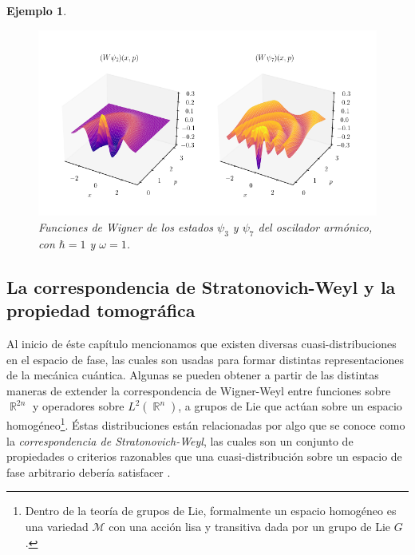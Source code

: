 \documentclass[a4paper]{report}
\DeclareMathOperator{\R}{\mathbb{R}}
\newtheorem{example}{Ejemplo}
\begin{document}
\begin{example}
    \begin{figure}[ht]
      \centering
      \includegraphics[width=1\textwidth]{
        imgs/harmonic_osc_wigner.png
      }
      \caption{Funciones de Wigner de los estados $\psi_3$ y
      $\psi_7$ del oscilador armónico, con $\hbar = 1$ y
      $\omega = 1$.}
      \label{fig:harmonic_osc_wigner_3_7}
    \end{figure}
  \end{example}
  
  \subsection{La correspondencia de Stratonovich-Weyl y la
  propiedad tomográfica}

  Al inicio de éste capítulo mencionamos que existen
  diversas cuasi-distribuciones en el espacio de fase, las
  cuales son usadas para formar distintas representaciones
  de la mecánica cuántica. Algunas se pueden obtener a
  partir de las distintas maneras de extender la
  correspondencia de Wigner-Weyl entre funciones sobre
  $\R^{2n}$ y operadores sobre $L^2(\R^{n})$, a grupos de
  Lie que actúan sobre un espacio homogéneo\footnote{Dentro
    de la teoría de grupos de Lie, formalmente un espacio
  homogéneo es una variedad $\mathcal M$ con una acción lisa
  y transitiva dada por un grupo de Lie $G$.}. Éstas
  distribuciones están relacionadas por algo que se conoce
  como la \textit{correspondencia de Stratonovich-Weyl}, las
  cuales son un conjunto de propiedades o criterios
  razonables que una cuasi-distribución sobre un espacio de
  fase arbitrario debería satisfacer \cite{cahen}. 
\end{document}

